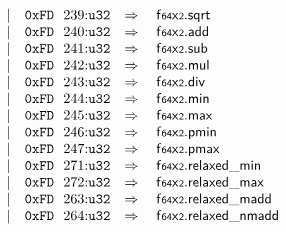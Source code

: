 $$\begin{array}[t]{@{}lrrl@{}l@{}l@{}l@{}}
& & | & \mathtt{0xFD}~~239{:}{\mathtt{u32}} & \quad\Rightarrow\quad{} & {\mathsf{f{\scriptstyle 64}}}{\mathsf{x}}{\mathsf{{\scriptstyle 2}}} {.} \mathsf{sqrt} \\
& & | & \mathtt{0xFD}~~240{:}{\mathtt{u32}} & \quad\Rightarrow\quad{} & {\mathsf{f{\scriptstyle 64}}}{\mathsf{x}}{\mathsf{{\scriptstyle 2}}} {.} \mathsf{add} \\
& & | & \mathtt{0xFD}~~241{:}{\mathtt{u32}} & \quad\Rightarrow\quad{} & {\mathsf{f{\scriptstyle 64}}}{\mathsf{x}}{\mathsf{{\scriptstyle 2}}} {.} \mathsf{sub} \\
& & | & \mathtt{0xFD}~~242{:}{\mathtt{u32}} & \quad\Rightarrow\quad{} & {\mathsf{f{\scriptstyle 64}}}{\mathsf{x}}{\mathsf{{\scriptstyle 2}}} {.} \mathsf{mul} \\
& & | & \mathtt{0xFD}~~243{:}{\mathtt{u32}} & \quad\Rightarrow\quad{} & {\mathsf{f{\scriptstyle 64}}}{\mathsf{x}}{\mathsf{{\scriptstyle 2}}} {.} \mathsf{div} \\
& & | & \mathtt{0xFD}~~244{:}{\mathtt{u32}} & \quad\Rightarrow\quad{} & {\mathsf{f{\scriptstyle 64}}}{\mathsf{x}}{\mathsf{{\scriptstyle 2}}} {.} \mathsf{min} \\
& & | & \mathtt{0xFD}~~245{:}{\mathtt{u32}} & \quad\Rightarrow\quad{} & {\mathsf{f{\scriptstyle 64}}}{\mathsf{x}}{\mathsf{{\scriptstyle 2}}} {.} \mathsf{max} \\
& & | & \mathtt{0xFD}~~246{:}{\mathtt{u32}} & \quad\Rightarrow\quad{} & {\mathsf{f{\scriptstyle 64}}}{\mathsf{x}}{\mathsf{{\scriptstyle 2}}} {.} \mathsf{pmin} \\
& & | & \mathtt{0xFD}~~247{:}{\mathtt{u32}} & \quad\Rightarrow\quad{} & {\mathsf{f{\scriptstyle 64}}}{\mathsf{x}}{\mathsf{{\scriptstyle 2}}} {.} \mathsf{pmax} \\
& & | & \mathtt{0xFD}~~271{:}{\mathtt{u32}} & \quad\Rightarrow\quad{} & {\mathsf{f{\scriptstyle 64}}}{\mathsf{x}}{\mathsf{{\scriptstyle 2}}} {.} \mathsf{relaxed\_min} \\
& & | & \mathtt{0xFD}~~272{:}{\mathtt{u32}} & \quad\Rightarrow\quad{} & {\mathsf{f{\scriptstyle 64}}}{\mathsf{x}}{\mathsf{{\scriptstyle 2}}} {.} \mathsf{relaxed\_max} \\
& & | & \mathtt{0xFD}~~263{:}{\mathtt{u32}} & \quad\Rightarrow\quad{} & {\mathsf{f{\scriptstyle 64}}}{\mathsf{x}}{\mathsf{{\scriptstyle 2}}} {.} \mathsf{relaxed\_madd} \\
& & | & \mathtt{0xFD}~~264{:}{\mathtt{u32}} & \quad\Rightarrow\quad{} & {\mathsf{f{\scriptstyle 64}}}{\mathsf{x}}{\mathsf{{\scriptstyle 2}}} {.} \mathsf{relaxed\_nmadd} \\

\end{array}$$
